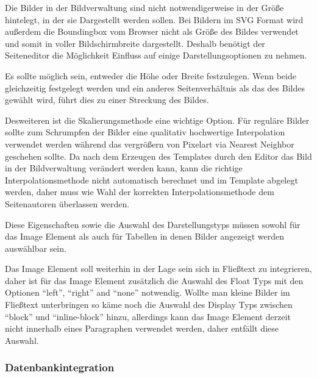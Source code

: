 Die Bilder in der Bildverwaltung sind nicht notwendigerweise in der Größe
hintelegt, in der sie Dargestellt werden sollen. Bei Bildern im SVG Format
wird außerdem die Boundingbox vom Browser nicht als Größe des Bildes verwendet
und somit in voller Bildschirmbreite dargestellt. Deshalb benötigt der
Seiteneditor die Möglichkeit Einfluss auf einige Darstellungsoptionen zu nehmen.

Es sollte möglich sein, entweder die Höhe oder Breite festzulegen. Wenn beide
gleichzeitig festgelegt werden und ein anderes Seitenverhältnis als das des
Bildes gewählt wird, führt dies zu einer Streckung des Bildes.

Desweiteren ist die Skalierungsmethode eine wichtige Option. Für reguläre Bilder
sollte zum Schrumpfen der Bilder eine qualitativ hochwertige Interpolation
verwendet werden während das vergrößern von Pixelart via Nearest Neighbor
geschehen sollte. Da nach dem Erzeugen des Templates durch den Editor das Bild
in der Bildverwaltung verändert werden kann, kann die richtige
Interpolationsmethode nicht automatisch berechnet und im Template abgelegt
werden, daher muss wie Wahl der korrekten Interpolationsmethode dem
Seitenautoren überlassen werden.

Diese Eigenschaften sowie die Auswahl des Darstellungstyps müssen sowohl für das
Image Element als auch für Tabellen in denen Bilder angezeigt werden auswählbar
sein.

Das Image Element soll weiterhin in der Lage sein sich in Fließtext zu
integrieren, daher ist für das Image Element zusätzlich die Auswahl des Float
Typs mit den Optionen ``left'', ``right'' and ``none'' notwendig. Wollte man
kleine Bilder im Fließtext unterbringen so käme noch die Auswahl des Display
Typs zwischen ``block'' und ``inline-block'' hinzu, allerdings kann das Image
Element derzeit nicht innerhalb eines Paragraphen verwendet werden, daher
entfällt diese Auswahl.

\subsubsection{Datenbankintegration}


